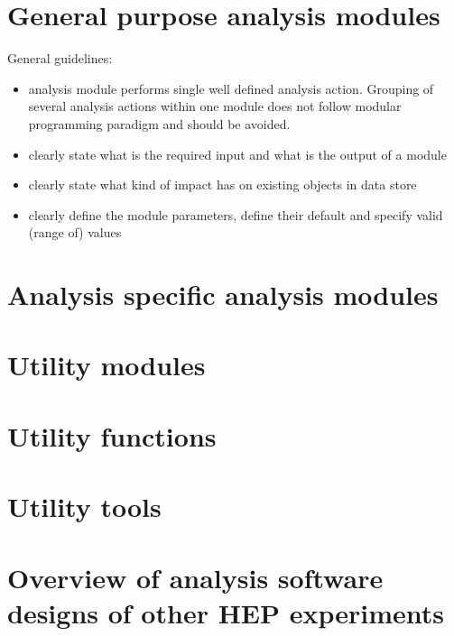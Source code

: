 \documentclass[a4paper,11pt]{article}
\begin{document}






\newpage
\section{General purpose analysis modules}

General guidelines:
\begin{itemize}
 \item analysis module performs single well defined analysis action. Grouping of several analysis actions within one 
 module does not follow modular programming paradigm and should be avoided.
 \item clearly state what is the required input and what is the output of a module
 \item clearly state what kind of impact has on existing objects in data store
 \item clearly define the module parameters, define their default and specify valid (range of) values
\end{itemize}









\section{Analysis specific analysis modules}

\section{Utility modules}


\section{Utility functions}

\section{Utility tools}



\section{Overview of analysis software designs of other HEP experiments}




\end{document}
